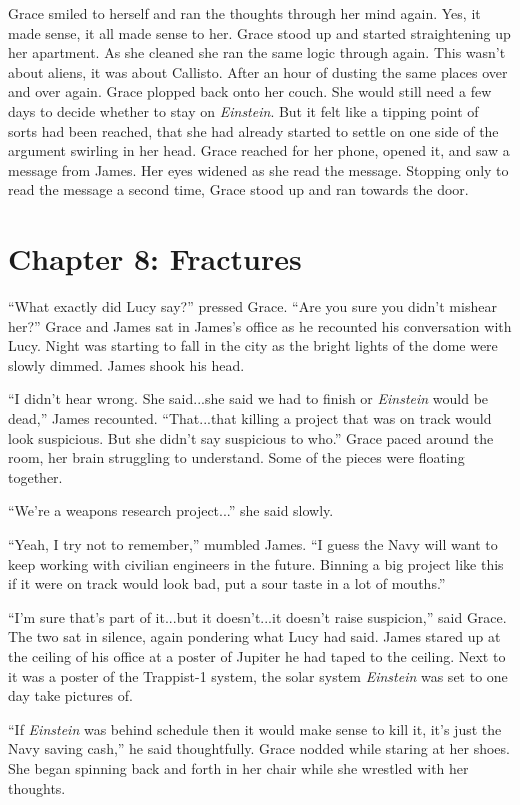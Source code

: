 \documentclass[12pt]{article} %
\begin{document}
Grace smiled to herself and ran the thoughts through her mind again. Yes, it made sense, it all made sense to her. Grace stood up and started straightening up her apartment. As she cleaned she ran the same logic through again. This wasn't about aliens, it was about Callisto. After an hour of dusting the same places over and over again. Grace plopped back onto her couch. She would still need a few days to decide whether to stay on \textit{Einstein}. But it felt like a tipping point of sorts had been reached, that she had already started to settle on one side of the argument swirling in her head. Grace reached for her phone, opened it, and saw a message from James. Her eyes widened as she read the message. Stopping only to read the message a second time, Grace stood up and ran towards the door.

\newpage
\section{Chapter 8: Fractures}

``What exactly did Lucy say?'' pressed Grace. ``Are you sure you didn't mishear her?'' Grace and James sat in James's office as he recounted his conversation with Lucy. Night was starting to fall in the city as the bright lights of the dome were slowly dimmed. James shook his head.

``I didn't hear wrong. She said...she said we had to finish or \textit{Einstein} would be dead,'' James recounted. ``That...that killing a project that was on track would look suspicious. But she didn't say suspicious to who.'' Grace paced around the room, her brain struggling to understand. Some of the pieces were floating together.

``We're a weapons research project...'' she said slowly.

``Yeah, I try not to remember,'' mumbled James. ``I guess the Navy will want to keep working with civilian engineers in the future. Binning a big project like this if it were on track would look bad, put a sour taste in a lot of mouths.''

``I'm sure that's part of it...but it doesn't...it doesn't raise suspicion,'' said Grace. The two sat in silence, again pondering what Lucy had said. James stared up at the ceiling of his office at a poster of Jupiter he had taped to the ceiling. Next to it was a poster of the Trappist-1 system, the solar system \textit{Einstein} was set to one day take pictures of.

``If \textit{Einstein} was behind schedule then it would make sense to kill it, it's just the Navy saving cash,'' he said thoughtfully. Grace nodded while staring at her shoes. She began spinning back and forth in her chair while she wrestled with her thoughts.
\end{document}
